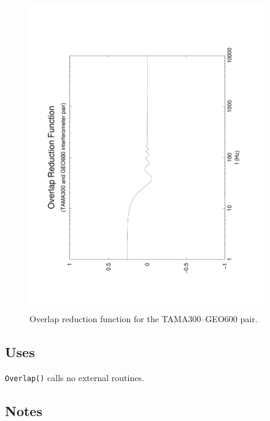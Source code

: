 \documentclass{article}
\begin{document}
%
%
\begin{figure}[htb!]
\begin{center}
\noindent\includegraphics[width=4in,angle=-90]{TAMA300GEO600}
\caption{\label{f:TAMA300GEO600}
Overlap reduction function for the TAMA300--GEO600 pair.}
\end{center}
\end{figure}
%

\subsection{Uses}

{\tt Overlap()\/} calls no external routines.

\subsection{Notes}
\end{document}
